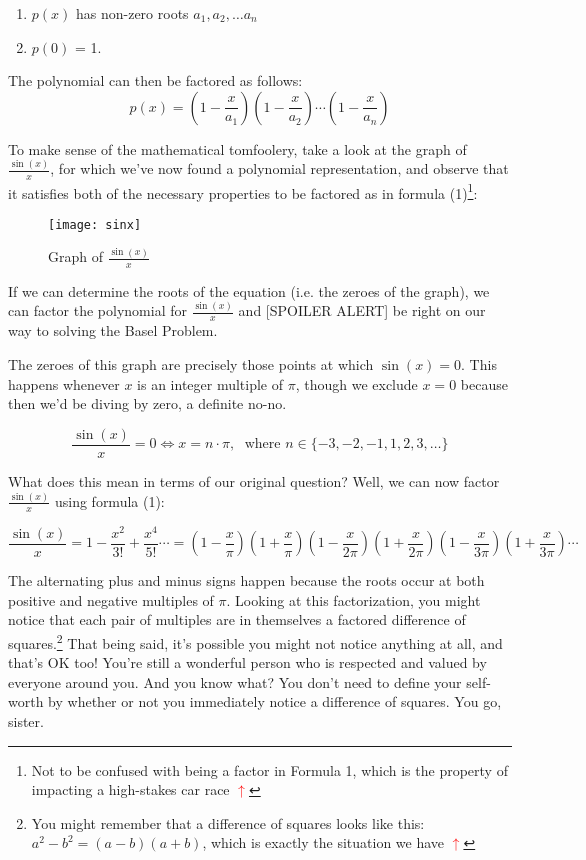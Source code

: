 \documentclass[11pt,titlepage]{article}
\begin{document}
\begin{enumerate}
\item $p(x)$ has non-zero roots $a_1, a_2, \ldots a_n$
\item $p(0)$ = 1. 
\end{enumerate}
The polynomial can then be factored as follows:
\begin{equation}
p(x) = \left(1-\frac{x}{a_1}\right)\left(1-\frac{x}{a_2}\right)\cdots\left(1-\frac{x}{a_n}\right)
\end{equation} 


To make sense of the mathematical tomfoolery, take a look at the graph of $\frac{\sin(x)}{x}$, for which we've now found a polynomial representation, and observe that it satisfies both of the necessary properties to be factored as in formula (1)\label{formula}\footnote{Not to be confused with being a factor in Formula 1, which is the property of impacting a high-stakes car race \hyperref[formula]{\textbf{\textcolor{red}{$\uparrow$}}}}:

\begin{figure}[h]
\centering
\texttt{[image: sinx]}
\caption{Graph of $\frac{\sin(x)}{x}$}
\end{figure}

If we can determine the roots of the equation (i.e. the zeroes of the graph), we can factor the polynomial for $\frac{\sin(x)}{x}$ and {\color{red}[SPOILER ALERT]} be right on our way to solving the Basel Problem.

The zeroes of this graph are precisely those points at which $\sin(x) = 0$. This happens whenever $x$ is an  integer multiple of $\pi$, though we exclude $x = 0$ because then we'd be diving by zero, a definite no-no.%

$$\frac{\sin(x)}{x} = 0 \Longleftrightarrow x = n\cdot\pi, \; \text{ where }
n \in \{-3, -2, -1, 1, 2, 3, \ldots\}$$   

What does this mean in terms of our original question? Well, we can now factor $\frac{\sin(x)}{x}$ using formula (1):

$$\frac{\sin(x)}{x} = 1 - \frac{x^2}{3!} + \frac{x^4}{5!} \cdots = \left(1-\frac{x}{\pi}\right)\left(1+\frac{x}{\pi}\right)\left(1-\frac{x}{2\pi}\right)\left(1+\frac{x}{2\pi}\right)\left(1-\frac{x}{3\pi}\right)\left(1+\frac{x}{3\pi}\right)\cdots$$ 

The alternating plus and minus signs happen because the roots occur at both positive and negative multiples of $\pi$. \hypertarget{squares}{}Looking at this factorization, you might notice that each pair of multiples are in themselves a factored difference of squares.\footnote{You might remember that a difference of squares looks like this: $a^2-b^2 = (a-b)(a+b)$, which is exactly the situation we have \hyperlink{squares}{\textbf{\textcolor{red}{$\uparrow$}}}} That being said, it's possible you might not notice anything at all, and that's OK too! You're still a wonderful person who is respected and valued by everyone around you. And you know what? You don't need to define your self-worth by whether or not you immediately notice a difference of squares. You go, sister. 
\end{document}
